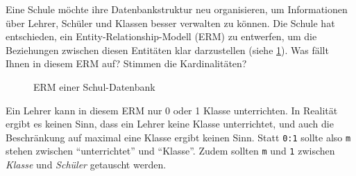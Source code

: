 \begin{myexercise}
  Eine Schule möchte ihre Datenbankstruktur neu organisieren, um Informationen über Lehrer, Schüler und Klassen besser verwalten zu können.
  Die Schule hat entschieden, ein Entity-Relationship-Modell (ERM) zu entwerfen, um die Beziehungen zwischen diesen Entitäten klar darzustellen (siehe \cref{fig:erm-school}).
  Was fällt Ihnen in diesem \gls{ERM} auf? Stimmen die Kardinalitäten?
  \begin{figure}[H]
    \centering

    \caption{\gls{ERM} einer Schul-Datenbank}
    \label{fig:erm-school}
  \end{figure}

  \begin{myanswer}
    Ein Lehrer kann in diesem \gls{ERM} nur 0 oder 1 Klasse unterrichten.
    In Realität ergibt es keinen Sinn, dass ein Lehrer keine Klasse unterrichtet, und auch die Beschränkung auf maximal eine Klasse ergibt keinen Sinn.
    Statt \texttt{0:1} sollte also \texttt{m} stehen zwischen \enquote{unterrichtet} und \enquote{Klasse}.
    Zudem sollten \texttt{m} und \texttt{1} zwischen \textit{Klasse} und \textit{Schüler} getauscht werden.
  \end{myanswer}
\end{myexercise}

